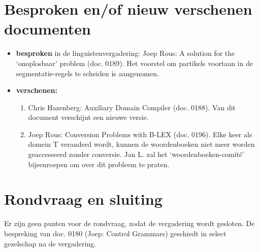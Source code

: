 \section{Besproken en/of nieuw verschenen documenten}
\begin{itemize}
\item {\bf besproken} in de linguistenvergadering: Joep Rous: A solution for 
the `on\-oplosbaar' problem (doc. 0189). Het voorstel om partikels voortaan in 
de segmentatie-regels te scheiden is aangenomen.
\item {\bf verschenen:}
\begin{enumerate}
\item Chris Hazenberg: Auxiliary Domain Compiler (doc. 0188). Van dit document 
verschijnt een nieuwe versie.
\item Joep Rous: Conversion Problems with B-LEX (doc. 0196). Elke keer als 
domein T veranderd wordt, kunnen de woordenboeken niet meer worden geaccesseerd 
zonder conversie. Jan L. zal het `woordenboeken-comit\'{e}' bijeenroepen om 
over dit probleem te praten.
\end{enumerate}
\end{itemize}

\section{Rondvraag en sluiting}
Er zijn geen punten voor de rondvraag, zodat de vergadering wordt gesloten.
De bespreking van doc. 0180 (Joep: Control Grammars) geschiedt in select 
gezelschap na de vergadering.


